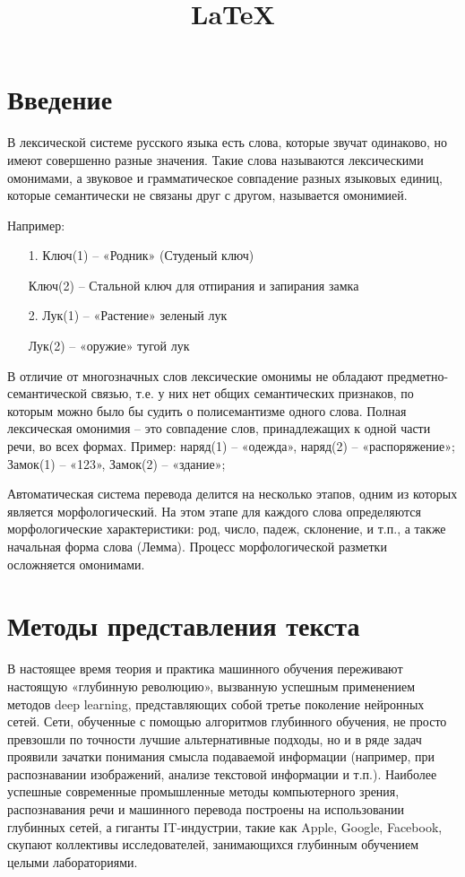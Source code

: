 \documentclass[12pt]{article}
\title{\LaTeX}
\date{}
\begin{document}
\def\dd#1#2{\frac{\partial#1}{\partial#2}}
\section{Введение}
В лексической системе русского языка есть слова, которые звучат одинаково, но имеют совершенно разные значения. Такие слова называются лексическими омонимами, а звуковое и грамматическое совпадение разных языковых единиц, которые семантически не связаны друг с другом, называется омонимией.

Например:
\begin{itemize}
\item[1.] Ключ(1) – «Родник» (Студеный ключ)
\item[] Ключ(2) – Стальной ключ для отпирания и запирания замка
\item[2.] Лук(1) – «Растение» зеленый лук
\item[] Лук(2) – «оружие» тугой лук
\end{itemize}

В отличие от многозначных слов лексические омонимы не обладают предметно-семантической связью, т.е. у них нет общих семантических признаков, по которым можно было бы судить о полисемантизме одного слова. Полная лексическая омонимия – это совпадение слов, принадлежащих к одной части речи, во всех формах. Пример: наряд(1) – «одежда», наряд(2) – «распоряжение»; Замок(1) – «123», Замок(2) – «здание»;

Автоматическая система перевода делится на несколько этапов, одним из которых является морфологический. На этом этапе для каждого слова определяются морфологические характеристики: род, число, падеж, склонение, и т.п., а также начальная форма слова (Лемма). Процесс морфологической разметки осложняется омонимами.
\section{Методы представления текста}
	В настоящее время теория и практика машинного обучения переживают настоящую «глубинную революцию», вызванную успешным применением методов deep learning, представляющих собой третье поколение нейронных сетей. Сети, обученные с помощью алгоритмов глубинного обучения, не просто превзошли по точности лучшие альтернативные подходы, но и в ряде задач проявили зачатки понимания смысла подаваемой информации (например, при распознавании изображений, анализе текстовой информации и т.п.). Наиболее успешные современные промышленные методы компьютерного зрения, распознавания речи и машинного перевода построены на использовании глубинных сетей, а гиганты IT-индустрии, такие как Apple, Google, Facebook, скупают коллективы исследователей, занимающихся глубинным обучением целыми лабораториями.
\end{document}
